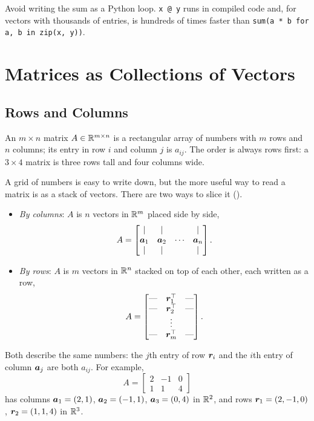Avoid writing the sum as a Python loop. \texttt{x @ y} runs in compiled
code and, for vectors with thousands of entries, is hundreds of times
faster than \texttt{sum(a * b for a, b in zip(x, y))}.

\section{Matrices as Collections of Vectors}
\label{sec:ch03-matrices}

\subsection{Rows and Columns}
\label{sec:ch03-rows-cols}

An $m \times n$ matrix $A \in \mathbb{R}^{m \times n}$ is a rectangular array of
numbers with $m$ rows and $n$ columns; its entry in row $i$ and column $j$
is $a_{ij}$. The order is always rows first: a $3 \times 4$ matrix is three
rows tall and four columns wide.

A grid of numbers is easy to write down, but the more useful way to read a
matrix is as a stack of vectors. There are two ways to slice it
().
\begin{itemize}
  \item \emph{By columns}: $A$ is $n$ vectors in $\mathbb{R}^m$ placed side by side,
    \[
      A =
      \begin{bmatrix}
        | & | & & | \\
        \bm{a}_1 & \bm{a}_2 & \cdots & \bm{a}_n \\
        | & | & & |
      \end{bmatrix}.
    \]
  \item \emph{By rows}: $A$ is $m$ vectors in $\mathbb{R}^n$ stacked on top of each
    other, each written as a row,
    \[
      A =
      \begin{bmatrix}
        \text{---} & \bm{r}_1^\top & \text{---} \\
        \text{---} & \bm{r}_2^\top & \text{---} \\
        & \vdots & \\
        \text{---} & \bm{r}_m^\top & \text{---}
      \end{bmatrix}.
    \]
\end{itemize}
Both describe the same numbers: the $j$th entry of row $\bm{r}_i$ and the
$i$th entry of column $\bm{a}_j$ are both $a_{ij}$. For example,
\[
  A =
  \begin{bmatrix}
    2 & -1 & 0 \\
    1 & 1 & 4
  \end{bmatrix}
\]
has columns $\bm{a}_1 = (2, 1)$, $\bm{a}_2 = (-1, 1)$,
$\bm{a}_3 = (0, 4)$ in $\mathbb{R}^2$, and rows $\bm{r}_1 = (2, -1, 0)$,
$\bm{r}_2 = (1, 1, 4)$ in $\mathbb{R}^3$.


